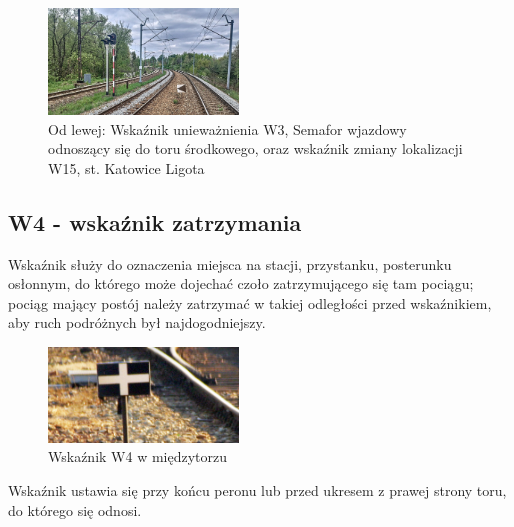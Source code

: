 	\begin{figure}
		\includegraphics[width=0.45\textwidth]{skryptkierownik-img/wskaznik-w3.jpg}
		\caption{Od lewej: Wskaźnik unieważnienia W3, Semafor wjazdowy odnoszący się do toru środkowego, oraz wskaźnik zmiany lokalizacji W15, st. Katowice Ligota}
	\end{figure}

\subsection{W4 - wskaźnik zatrzymania}

\begin{tcolorbox}[colback=black!5!white,colframe=white!55!black,title=Wskaźnik W4]Wskaźnik służy do oznaczenia miejsca na stacji, przystanku, posterunku osłonnym, do którego może dojechać czoło zatrzymującego się tam pociągu; pociąg mający postój należy zatrzymać w takiej odległości przed wskaźnikiem, aby ruch podróżnych był najdogodniejszy.
\end{tcolorbox}
	
\begin{figure}
	\includegraphics[width=0.45\textwidth]{skryptkierownik-img/skryptkierownik-img006.jpg}
	\caption{Wskaźnik W4 w międzytorzu}
\end{figure} 
Wskaźnik ustawia się przy końcu peronu lub przed ukresem z prawej strony toru, do którego się odnosi.

